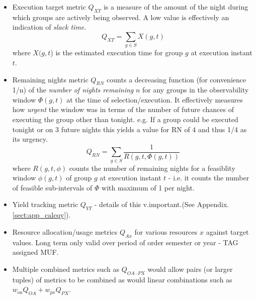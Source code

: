 \begin{itemize}
\item Execution target metric $Q_{XT}$ is a measure of the amount of the night during which groups are actively being observed. A low value is effectively an indication of \emph{slack time}.
\begin{equation}
Q_{XT} = \sum_{g \in S}{X(g,t)}
\end{equation}
where $X(g,t$) is the estimated execution time for group $g$ at execution instant $t$.

\item Remaining nights metric $Q_{RN}$ counts a decreasing function (for convenience 1/n) of the \emph{number of nights remaining} $n$ for any groups in the observability window $\Phi(g,t)$ at the time of selection/execution. It effectively measures how \emph{urgent} the window was in terms of the number of future chances of executing 
the group other than tonight. e.g. If a group could be executed tonight or on 3 future nights this yields a value for RN of 4 and thus 1/4 as its urgency.
\begin{equation}
Q_{RN} = \sum_{g \in S}{\frac{1}{R(g,t,\Phi(g,t))}}
\end{equation}
where $R(g,t,\phi)$ counts the number of remaining nights for a feasiblity window $\phi(g,t)$ of group $g$ at execution instant $t$ - i.e. it counts the number of feasible sub-intervals of $\Phi$ with maximum of 1 per night.

\item Yield tracking metric $Q_{YT}$ - details of this v.important.(See Appendix. \ref{sect:app_calcqy}).


\item Resource allocation/usage metrics $Q_{Ax}$ for various resources $x$ against target values. Long term only valid over period of order semester or year - TAG assigned MUF.

\item Multiple combined metrics such as $Q_{OA \cdot PX}$ would allow pairs (or larger tuples) of metrics to be combined as would linear combinations such as $w_{oa}Q_{OA}+w_{px}Q_{PX}$.

\end{itemize}
